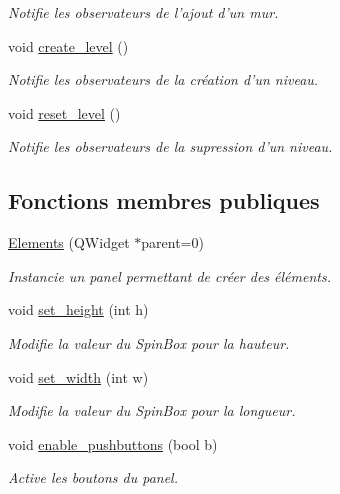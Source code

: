 \begin{DoxyCompactItemize}
\begin{DoxyCompactList}\small\item\em Notifie les observateurs de l'ajout d'un mur. \end{DoxyCompactList}\item 
\hypertarget{classElements_ad4bfaa4ea43fffd8653224165b5bbc29}{void \hyperlink{classElements_ad4bfaa4ea43fffd8653224165b5bbc29}{create\+\_\+level} ()}\label{classElements_ad4bfaa4ea43fffd8653224165b5bbc29}

\begin{DoxyCompactList}\small\item\em Notifie les observateurs de la création d'un niveau. \end{DoxyCompactList}\item 
\hypertarget{classElements_a938cdaf6c97d1c9e5db80280b6379176}{void \hyperlink{classElements_a938cdaf6c97d1c9e5db80280b6379176}{reset\+\_\+level} ()}\label{classElements_a938cdaf6c97d1c9e5db80280b6379176}

\begin{DoxyCompactList}\small\item\em Notifie les observateurs de la supression d'un niveau. \end{DoxyCompactList}\end{DoxyCompactItemize}
\subsection*{Fonctions membres publiques}
\begin{DoxyCompactItemize}
\item 
\hyperlink{classElements_a2b73500c747cc879fe708d35aba45532}{Elements} (Q\+Widget $\ast$parent=0)
\begin{DoxyCompactList}\small\item\em Instancie un panel permettant de créer des éléments. \end{DoxyCompactList}\item 
void \hyperlink{classElements_a077b89b923b450bda172001121825e03}{set\+\_\+height} (int h)
\begin{DoxyCompactList}\small\item\em Modifie la valeur du Spin\+Box pour la hauteur. \end{DoxyCompactList}\item 
void \hyperlink{classElements_af6c7af0c40d3840296224453352fc534}{set\+\_\+width} (int w)
\begin{DoxyCompactList}\small\item\em Modifie la valeur du Spin\+Box pour la longueur. \end{DoxyCompactList}\item 
void \hyperlink{classElements_ac8411c290c41dcb1777cb649155d3c04}{enable\+\_\+pushbuttons} (bool b)
\begin{DoxyCompactList}\small\item\em Active les boutons du panel. \end{DoxyCompactList}\end{DoxyCompactItemize}
